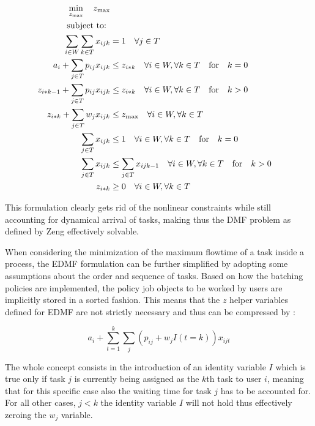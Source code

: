 \documentclass{seal_thesis}
\begin{document}
\begin{align}
    \min_{z_{\text{max}}} \quad z_{\text{max}}\\
    \text{subject to: } \notag \\
    \sum_{i \in W} \sum_{k \in T} x_{ijk} &= 1 \quad \forall j \in T\\
    a_i + \sum_{j \in T} p_{ij} x_{ijk} &\leq z_{i*k} \quad \forall i \in W, \forall k \in T \quad \text{for} \quad k=0\\
    z_{i*k-1} + \sum_{j \in T} p_{ij} x_{ijk} &\leq z_{i*k} \quad \forall i \in W, \forall k \in T \quad \text{for} \quad k>0\\
    z_{i*k}+ \sum_{j \in T} w_j x_{ijk} &\leq z_{\text{max}} \quad \forall i \in W, \forall k \in T\\
    \sum_{j \in T} x_{ijk} &\leq 1 \quad \forall i \in W, \forall k \in T \quad \text{for} \quad k=0\\
    \sum_{j \in T} x_{ijk} &\leq \sum_{j \in T} x_{ijk-1} \quad \forall i \in W, \forall k \in T \quad \text{for} \quad k>0\\
    z_{i*k} &\geq 0 \quad \forall i \in W, \forall k \in T
\end{align}

This formulation clearly gets rid of the nonlinear constraints while still accounting for dynamical arrival of tasks, making thus the DMF problem as defined by Zeng effectively solvable.

When considering the minimization of the maximum flowtime of a task inside a process, the EDMF formulation can be further simplified by adopting some assumptions about the order and sequence of tasks. Based on how the batching policies are implemented, the policy job objects to be worked by users are implicitly stored in a sorted fashion. This means that the $z$ helper variables defined for EDMF are not strictly necessary and thus can be compressed by :

\begin{equation}
\label{eq:simplified_z_with_k}
	a_i + \sum_{t=1}^k \sum_j (p_{ij} + w_j I(t=k))x_{ijt}
\end{equation}

The whole concept consists in the introduction of an identity variable $I$ which is true only if task $j$ is currently being assigned as the $k$th task to user $i$, meaning that for this specific case also the waiting time for task $j$ has to be accounted for. For all other cases, \ie $j<k$ the identity variable $I$ will not hold thus effectively zeroing the $w_j$ variable.
\end{document}
